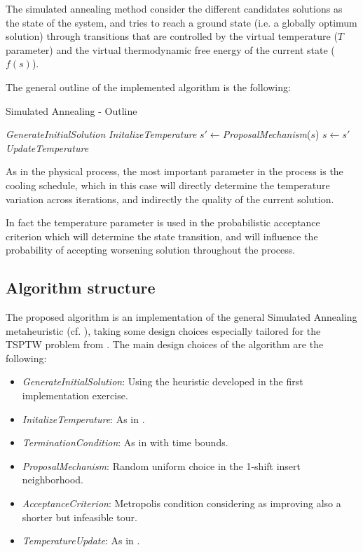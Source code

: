 \begin{homeworkProblem}
The simulated annealing method consider the different candidates solutions as the state of the system, and tries to reach a ground state (i.e. a globally optimum solution) through transitions that are controlled by the virtual temperature ($T$ parameter) and the virtual thermodynamic free energy of the current state ($f(s)$).

The general outline of the implemented algorithm is the following: 

\begin{algorithm}[!h]
  \caption{Simulated Annealing - Outline}\label{sa:outline}
  \begin{algorithmic}[1]
    \State \emph{GenerateInitialSolution}
    \State \emph{InitalizeTemperature} 
        \State $s' \gets $\emph{ProposalMechanism}($s$)
          \State $s \gets s'$
        \EndIf
        \State \emph{UpdateTemperature}
    \EndWhile
\end{algorithmic}
\end{algorithm}

As in the physical process, the most important parameter in the process is the cooling schedule, which in this case will  directly determine the temperature variation across iterations, and indirectly the quality of the current solution.

In fact the temperature parameter is used in the probabilistic acceptance criterion which will determine the state transition, and will influence the probability of accepting worsening solution throughout the process.  

\subsection{Algorithm structure} \label{sec:algstrucSA}
The proposed algorithm is an implementation of the general Simulated Annealing metaheuristic (cf. \cite{kirkpatrick1983optimization}), taking some design choices especially tailored for the TSPTW problem from \cite{ohlmann2007compressed}.
The main design choices of the algorithm are the following:
\begin{itemize}
  \item \emph{GenerateInitialSolution}: Using the heuristic developed in the first implementation exercise.
  \item \emph{InitalizeTemperature}: As in \cite{ohlmann2007compressed}.
  \item \emph{TerminationCondition}: As in \cite{ohlmann2007compressed} with time bounds.
  \item \emph{ProposalMechanism}: Random uniform choice in the 1-shift insert neighborhood.
  \item \emph{AcceptanceCriterion}: Metropolis condition considering as improving also a shorter but infeasible tour.
  \item \emph{TemperatureUpdate}: As in \cite{ohlmann2007compressed}.
\end{itemize}


\end{homeworkProblem}
